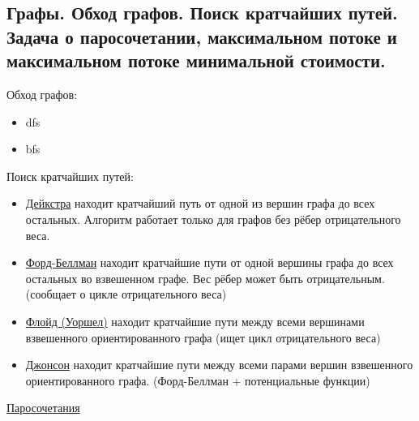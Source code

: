 \subsection{Графы. Обход графов. Поиск кратчайших путей. Задача о паросочетании, максимальном потоке и максимальном потоке минимальной стоимости.}

Обход графов:
\begin{itemize}
    \item dfs
    \item bfs
\end{itemize}

Поиск кратчайших путей:
\begin{itemize}
    \item \href{https://neerc.ifmo.ru/wiki/index.php?title=%D0%90%D0%BB%D0%B3%D0%BE%D1%80%D0%B8%D1%82%D0%BC_%D0%94%D0%B5%D0%B9%D0%BA%D1%81%D1%82%D1%80%D1%8B}{Дейкстра}
    находит кратчайший путь от одной из вершин графа до всех остальных. Алгоритм работает только для графов без рёбер отрицательного веса.
    \item \href{https://neerc.ifmo.ru/wiki/index.php?title=%D0%90%D0%BB%D0%B3%D0%BE%D1%80%D0%B8%D1%82%D0%BC_%D0%A4%D0%BE%D1%80%D0%B4%D0%B0-%D0%91%D0%B5%D0%BB%D0%BB%D0%BC%D0%B0%D0%BD%D0%B0}{Форд-Беллман}
    находит кратчайшие пути от одной вершины графа до всех остальных во взвешенном графе. Вес рёбер может быть отрицательным. (сообщает о цикле отрицательного веса)
    \item \href{https://neerc.ifmo.ru/wiki/index.php?title=%D0%90%D0%BB%D0%B3%D0%BE%D1%80%D0%B8%D1%82%D0%BC_%D0%A4%D0%BB%D0%BE%D0%B9%D0%B4%D0%B0}{Флойд (Уоршел)}
    находит кратчайшие пути между всеми вершинами взвешенного ориентированного графа (ищет цикл отрицательного веса)
    \item \href{https://neerc.ifmo.ru/wiki/index.php?title=%D0%90%D0%BB%D0%B3%D0%BE%D1%80%D0%B8%D1%82%D0%BC_%D0%94%D0%B6%D0%BE%D0%BD%D1%81%D0%BE%D0%BD%D0%B0}{Джонсон}
    находит кратчайшие пути между всеми парами вершин взвешенного ориентированного графа. (Форд-Беллман + потенциальные функции)
\end{itemize}

\href{https://neerc.ifmo.ru/wiki/index.php?title=%D0%9F%D0%B0%D1%80%D0%BE%D1%81%D0%BE%D1%87%D0%B5%D1%82%D0%B0%D0%BD%D0%B8%D1%8F:_%D0%BE%D1%81%D0%BD%D0%BE%D0%B2%D0%BD%D1%8B%D0%B5_%D0%BE%D0%BF%D1%80%D0%B5%D0%B4%D0%B5%D0%BB%D0%B5%D0%BD%D0%B8%D1%8F,_%D1%82%D0%B5%D0%BE%D1%80%D0%B5%D0%BC%D0%B0_%D0%BE_%D0%BC%D0%B0%D0%BA%D1%81%D0%B8%D0%BC%D0%B0%D0%BB%D1%8C%D0%BD%D0%BE%D0%BC_%D0%BF%D0%B0%D1%80%D0%BE%D1%81%D0%BE%D1%87%D0%B5%D1%82%D0%B0%D0%BD%D0%B8%D0%B8_%D0%B8_%D0%B4%D0%BE%D0%BF%D0%BE%D0%BB%D0%BD%D1%8F%D1%8E%D1%89%D0%B8%D1%85_%D1%86%D0%B5%D0%BF%D1%8F%D1%85}{Паросочетания}

